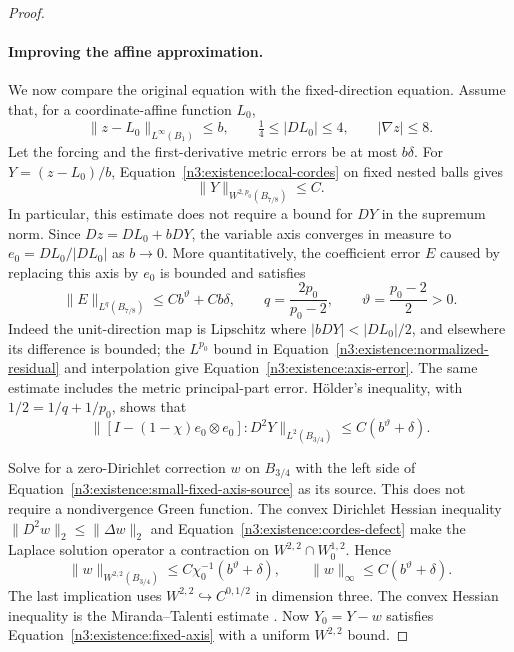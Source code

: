 \begin{proof}
\paragraph{Improving the affine approximation.}
We now compare the original equation with the fixed-direction equation.
Assume that, for a coordinate-affine function $L_0$,
\begin{equation}\label{n3:existence:flat-input}
 \|z-L_0\|_{L^\infty(B_1)}\le b,
 \qquad \tfrac14\le|DL_0|\le4,
 \qquad |\nabla z|\le8.
\end{equation}
Let the forcing and the first-derivative metric errors be at most
$b\delta$.  For $Y=(z-L_0)/b$, Equation~\eqref{n3:existence:local-cordes}
on fixed nested balls gives
\begin{equation}\label{n3:existence:normalized-residual}
 \|Y\|_{W^{2,p_0}(B_{7/8})}\le C.
\end{equation}
In particular, this estimate does not require a bound for
$DY$ in the supremum norm.  Since $Dz=DL_0+bDY$, the variable axis
converges in measure to $e_0=DL_0/|DL_0|$ as $b\to0$.  More
quantitatively, the coefficient error $E$ caused by replacing this
axis by $e_0$ is bounded and satisfies
\begin{equation}\label{n3:existence:axis-error}
 \|E\|_{L^q(B_{7/8})}\le Cb^{\vartheta}+Cb\delta,
 \qquad q=\frac{2p_0}{p_0-2},
 \qquad \vartheta=\frac{p_0-2}{2}>0.
\end{equation}
Indeed the unit-direction map is Lipschitz where
$|bDY|<|DL_0|/2$, and elsewhere its difference is bounded; the
$L^{p_0}$ bound in Equation~\eqref{n3:existence:normalized-residual}
and interpolation give Equation~\eqref{n3:existence:axis-error}.
The same estimate includes the metric principal-part error.
H\"older's inequality, with $1/2=1/q+1/p_0$, shows that
\begin{equation}\label{n3:existence:small-fixed-axis-source}
 \bigl\|[I-(1-\chi)e_0\otimes e_0]:D^2Y\bigr\|_{L^2(B_{3/4})}
 \le C(b^{\vartheta}+\delta).
\end{equation}

Solve for a zero-Dirichlet correction $w$ on $B_{3/4}$ with the
left side of Equation~\eqref{n3:existence:small-fixed-axis-source} as
its source.  This does not require a nondivergence Green function.
The convex Dirichlet Hessian inequality
$\|D^2w\|_2\le\|\Delta w\|_2$ and
Equation~\eqref{n3:existence:cordes-defect} make the Laplace solution
operator a contraction on $W^{2,2}\cap W^{1,2}_0$.  Hence
\begin{equation}\label{n3:existence:fixed-axis-correction}
 \|w\|_{W^{2,2}(B_{3/4})}
 \le C\chi_0^{-1}(b^{\vartheta}+\delta),\qquad
 \|w\|_\infty\le C(b^{\vartheta}+\delta).
\end{equation}
The last implication uses $W^{2,2}\hookrightarrow C^{0,1/2}$ in
dimension three.  The convex Hessian inequality is the
Miranda--Talenti estimate
\cite[Section~2, Theorem~3, p.~297]{Talenti1965}.
Now $Y_0=Y-w$ satisfies Equation~\eqref{n3:existence:fixed-axis} with
a uniform $W^{2,2}$ bound.


\end{proof}
